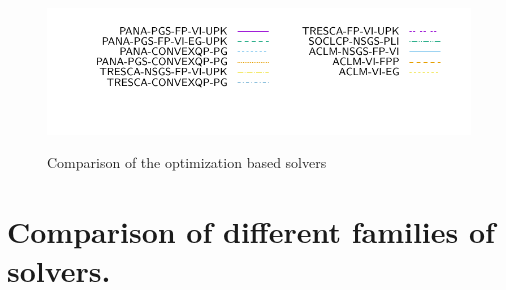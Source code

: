 \begin{figure}
 \\
{\includegraphics[height=\legendheight]{../figure/OPTI/1.0e-08/50/time/profile-Chain_legend.pdf}}
 \caption{Comparison of the optimization based solvers}
  \label{fig:OPTI}
\end{figure}



\section{Comparison of different families of solvers.}
\label{Sec:Comparison}

